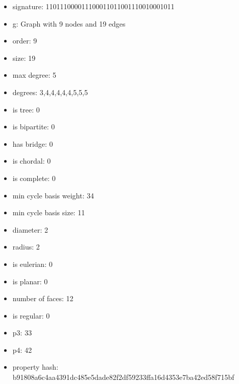 \newpage
\begin{figure}
\end{figure}
\begin{itemize}
\item signature: 110111000011100011011001110010001011
\item g: Graph with 9 nodes and 19 edges
\item order: 9
\item size: 19
\item max degree: 5
\item degrees: 3,4,4,4,4,4,5,5,5
\item is tree: 0
\item is bipartite: 0
\item has bridge: 0
\item is chordal: 0
\item is complete: 0
\item min cycle basis weight: 34
\item min cycle basis size: 11
\item diameter: 2
\item radius: 2
\item is eulerian: 0
\item is planar: 0
\item number of faces: 12
\item is regular: 0
\item p3: 33
\item p4: 42
\item property hash: b91808a6c4aa4391dc485e5dade82f2df59233ffa16d4353e7ba42ed58f715bf
\end{itemize}
